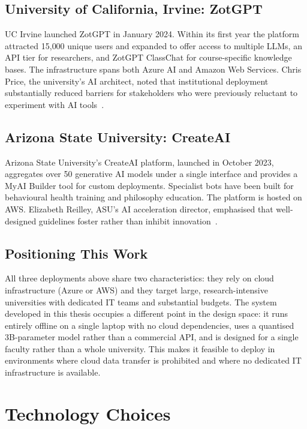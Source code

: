 \subsection{University of California, Irvine: ZotGPT}

UC Irvine launched ZotGPT in January 2024. Within its first year the platform attracted 15{,}000 unique users and expanded to offer access to multiple LLMs, an API tier for researchers, and ZotGPT ClassChat for course-specific knowledge bases. The infrastructure spans both Azure AI and Amazon Web Services. Chris Price, the university's AI architect, noted that institutional deployment substantially reduced barriers for stakeholders who were previously reluctant to experiment with AI tools~\cite{edtech2025chatbots}.

\subsection{Arizona State University: CreateAI}

Arizona State University's CreateAI platform, launched in October 2023, aggregates over 50 generative AI models under a single interface and provides a MyAI Builder tool for custom deployments. Specialist bots have been built for behavioural health training and philosophy education. The platform is hosted on AWS. Elizabeth Reilley, ASU's AI acceleration director, emphasised that well-designed guidelines foster rather than inhibit innovation~\cite{edtech2025chatbots}.

\subsection{Positioning This Work}

All three deployments above share two characteristics: they rely on cloud infrastructure (Azure or AWS) and they target large, research-intensive universities with dedicated IT teams and substantial budgets. The system developed in this thesis occupies a different point in the design space: it runs entirely offline on a single laptop with no cloud dependencies, uses a quantised 3B-parameter model rather than a commercial API, and is designed for a single faculty rather than a whole university. This makes it feasible to deploy in environments where cloud data transfer is prohibited and where no dedicated IT infrastructure is available.

\section{Technology Choices}
\label{sec:bg-tech}

